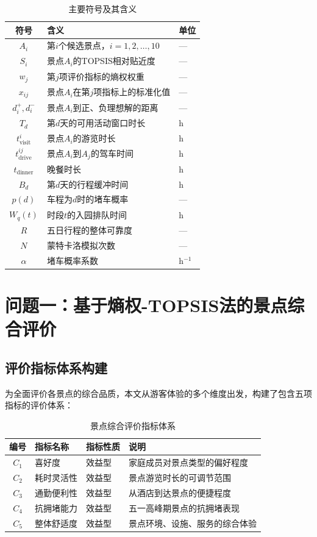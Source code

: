 \documentclass[12pt,a4paper]{ctexart}
\begin{document}
\begin{table}[H]
\centering
\caption{主要符号及其含义}
\label{tab:symbols}
\begin{tabular}{cll}
\toprule
\textbf{符号} & \textbf{含义} & \textbf{单位} \\
\midrule
$A_i$ & 第$i$个候选景点，$i=1,2,\ldots,10$ & --- \\
$S_i$ & 景点$A_i$的TOPSIS相对贴近度 & --- \\
$w_j$ & 第$j$项评价指标的熵权权重 & --- \\
$x_{ij}$ & 景点$A_i$在第$j$项指标上的标准化值 & --- \\
$d_i^+, d_i^-$ & 景点$A_i$到正、负理想解的距离 & --- \\
$T_d$ & 第$d$天的可用活动窗口时长 & h \\
$t_{\text{visit}}^i$ & 景点$A_i$的游览时长 & h \\
$t_{\text{drive}}^{ij}$ & 景点$A_i$到$A_j$的驾车时间 & h \\
$t_{\text{dinner}}$ & 晚餐时长 & h \\
$B_d$ & 第$d$天的行程缓冲时间 & h \\
$p(d)$ & 车程为$d$时的堵车概率 & --- \\
$W_q(t)$ & 时段$t$的入园排队时间 & h \\
$R$ & 五日行程的整体可靠度 & --- \\
$N$ & 蒙特卡洛模拟次数 & --- \\
$\alpha$ & 堵车概率系数 & h$^{-1}$ \\
\bottomrule
\end{tabular}
\end{table}

\section{问题一：基于熵权-TOPSIS法的景点综合评价}

\subsection{评价指标体系构建}

为全面评价各景点的综合品质，本文从游客体验的多个维度出发，构建了包含五项指标的评价体系：

\begin{table}[H]
\centering
\caption{景点综合评价指标体系}
\label{tab:indicators}
\begin{tabular}{clll}
\toprule
\textbf{编号} & \textbf{指标名称} & \textbf{指标性质} & \textbf{说明} \\
\midrule
$C_1$ & 喜好度 & 效益型 & 家庭成员对景点类型的偏好程度 \\
$C_2$ & 耗时灵活性 & 效益型 & 景点游览时长的可调节范围 \\
$C_3$ & 通勤便利性 & 效益型 & 从酒店到达景点的便捷程度 \\
$C_4$ & 抗拥堵能力 & 效益型 & 五一高峰期景点的抗拥堵表现 \\
$C_5$ & 整体舒适度 & 效益型 & 景点环境、设施、服务的综合体验 \\
\bottomrule
\end{tabular}
\end{table}
\end{document}
